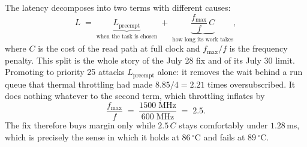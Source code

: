 The latency decomposes into two terms with different causes:
\begin{equation}
L \;=\; \underbrace{L_{\mathrm{preempt}}}_{\text{when the task is chosen}}
   \;+\; \underbrace{\frac{f_{\max}}{f}\,C}_{\text{how long its work takes}},
\label{eq:latencysplit}
\end{equation}
where $C$ is the cost of the read path at full clock and $f_{\max}/f$ is the
frequency penalty. This split is the whole story of the July 28 fix and of its
July 30 limit. Promoting  to  priority 25
attacks $L_{\mathrm{preempt}}$ alone: it removes the wait behind a run queue
that thermal throttling had made $8.85/4 = 2.21$ times oversubscribed.
It does nothing whatever to the second term, which throttling inflates by
\begin{equation}
\frac{f_{\max}}{f} \;=\; \frac{1500\;\text{MHz}}{600\;\text{MHz}} \;=\; 2.5 .
\label{eq:freqpenalty}
\end{equation}
The fix therefore buys margin only while $2.5\,C$ stays comfortably under
$1.28$\,ms, which is precisely the sense in which it holds at $86\,^\circ$C
and fails at $89\,^\circ$C.

